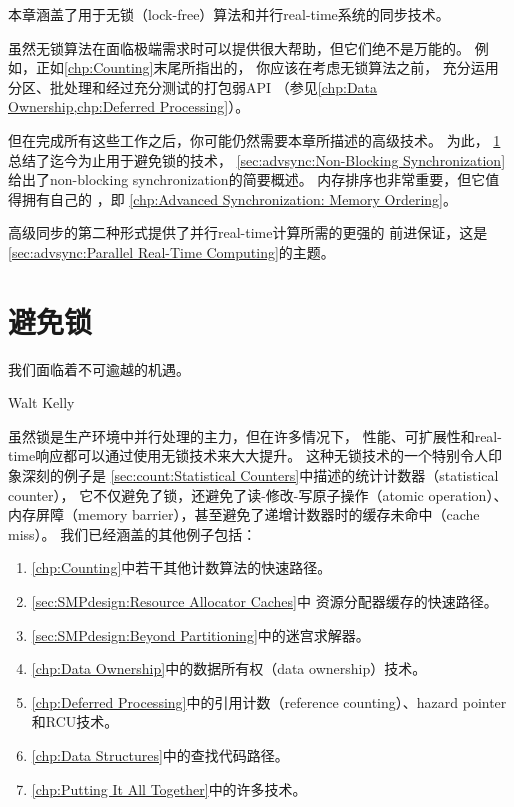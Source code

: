 
%

本章涵盖了用于无锁（lock-free）算法和并行real-time系统的同步技术。

虽然无锁算法在面临极端需求时可以提供很大帮助，但它们绝不是万能的。
例如，正如\cref{chp:Counting}末尾所指出的，
你应该在考虑无锁算法之前，
充分运用分区、批处理和经过充分测试的打包弱API
（参见\cref{chp:Data Ownership,chp:Deferred Processing}）。

但在完成所有这些工作之后，你可能仍然需要本章所描述的高级技术。
为此，
\cref{sec:advsync:Avoiding Locks}
总结了迄今为止用于避免锁的技术，
\cref{sec:advsync:Non-Blocking Synchronization}
给出了non-blocking synchronization的简要概述。
内存排序也非常重要，但它值得拥有自己的
，即
\cref{chp:Advanced Synchronization: Memory Ordering}。

高级同步的第二种形式提供了并行real-time计算所需的更强的
前进保证，这是
\cref{sec:advsync:Parallel Real-Time Computing}的主题。

\section{避免锁}
\label{sec:advsync:Avoiding Locks}
%
\epigraph{我们面临着不可逾越的机遇。}
	 {Walt Kelly}

虽然锁是生产环境中并行处理的主力，但在许多情况下，
性能、可扩展性和real-time响应都可以通过使用无锁技术来大大提升。
这种无锁技术的一个特别令人印象深刻的例子是
\cref{sec:count:Statistical Counters}中描述的统计计数器（statistical counter），
它不仅避免了锁，还避免了读-修改-写原子操作（atomic operation）、
内存屏障（memory barrier），甚至避免了递增计数器时的缓存未命中（cache miss）。
我们已经涵盖的其他例子包括：

\begin{enumerate}
\item	\cref{chp:Counting}中若干其他计数算法的快速路径。
\item	\cref{sec:SMPdesign:Resource Allocator Caches}中
	资源分配器缓存的快速路径。
\item	\cref{sec:SMPdesign:Beyond Partitioning}中的迷宫求解器。
\item	\cref{chp:Data Ownership}中的数据所有权（data ownership）技术。
\item	\cref{chp:Deferred Processing}中的引用计数（reference counting）、hazard pointer和RCU技术。
\item	\cref{chp:Data Structures}中的查找代码路径。
\item	\cref{chp:Putting It All Together}中的许多技术。
\end{enumerate}

